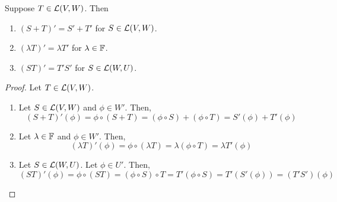 \begin{theorem}
    Suppose $T\in\mathcal{L}(V, W)$. Then
    \begin{enumerate}
        \item $(S+T)' = S'+T'$ for $S\in\mathcal{L}(V,W)$.
        \item $(\lambda T)' = \lambda T'$ for $\lambda\in\mathbb F$.
        \item $(ST)' = T'S'$ for $S\in\mathcal{L}(W,U)$.
    \end{enumerate}
\end{theorem}
\begin{proof}
    Let $T\in\mathcal{L}(V,W)$.
    \begin{enumerate}
        \item Let $S\in\mathcal{L}(V,W)$ and $\phi\in W'$. Then,
        \[ (S+T)'(\phi) = \phi \circ (S+T) = (\phi \circ S) + (\phi \circ T) = S'(\phi) + T'(\phi)\]
        \item Let $\lambda \in \mathbb F$ and $\phi\in W'$. Then,
        \[ (\lambda T)'(\phi) = \phi \circ (\lambda T) = \lambda (\phi \circ T) = \lambda T'(\phi) \]
        \item Let $S\in\mathcal{L}(W,U)$. Let $\phi \in U'$. Then,
        \[ (ST)'(\phi) = \phi \circ (ST) = (\phi \circ S) \circ T = T'(\phi \circ S) = T'(S'(\phi)) = (T'S')(\phi)\]
    \end{enumerate}
\end{proof}
